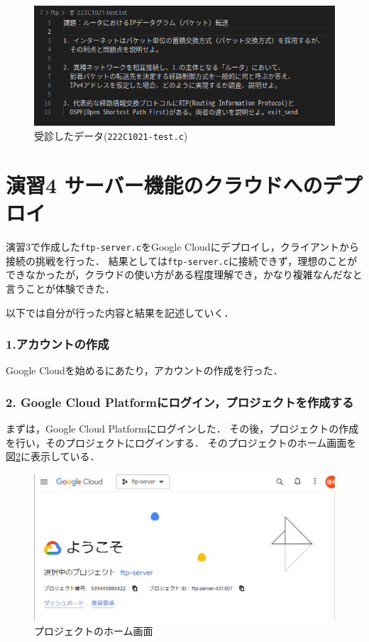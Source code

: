 \documentclass[documentclass]{jsarticle}
\begin{document}
\begin{figure}[H]
  \begin{center}
    \includegraphics*[]{figure/3-4.png}
  \end{center}
  \caption{受診したデータ(\texttt{222C1021-test.c})}
  \label{fig:3-4}
\end{figure}

\newpage
\section*{演習4 サーバー機能のクラウドへのデプロイ}
演習3で作成した\texttt{ftp-server.c}をGoogle Cloudにデプロイし，クライアントから接続の挑戦を行った．
結果としては\texttt{ftp-server.c}に接続できず，理想のことができなかったが，クラウドの使い方がある程度理解でき，かなり複雑なんだなと言うことが体験できた．

以下では自分が行った内容と結果を記述していく．

\subsubsection*{1.アカウントの作成}
Google Cloudを始めるにあたり，アカウントの作成を行った．

\subsubsection*{2. Google Cloud Platformにログイン，プロジェクトを作成する}
まずは，Google Cloud Platformにログインした．
その後，プロジェクトの作成を行い，そのプロジェクトにログインする．
そのプロジェクトのホーム画面を図\ref*{fig:4-1}に表示している．
\begin{figure}[H]
  \begin{center}
    \includegraphics*[scale=0.5]{figure/4-1.png}
  \end{center}
  \caption{プロジェクトのホーム画面}
  \label{fig:4-1}
\end{figure}
\end{document}
